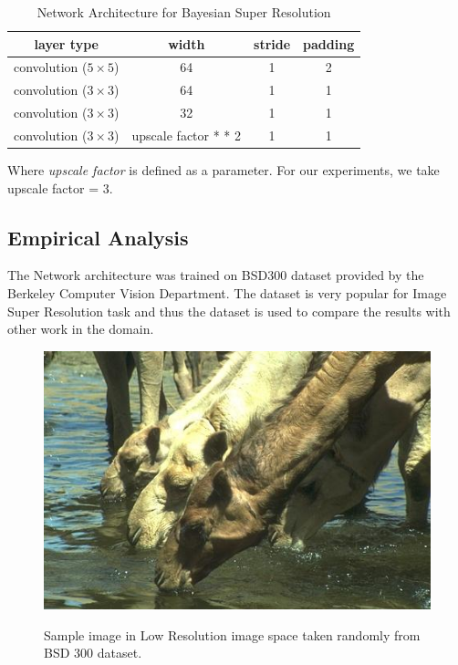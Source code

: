 \begin{table}[H]
    \centering
    \renewcommand{\arraystretch}{2}
    \begin{tabular}{c c c c } 
 \hline
 layer type & width & stride & padding  \\ [0.5ex] 
 \hline
 convolution ($5\times5$) & 64 & 1 & 2 \\
 
 convolution ($3\times3$) & 64 & 1 & 1 \\
 
 
 convolution ($3\times3$) & 32 & 1 & 1 \\
 
 convolution ($3\times3$) & upscale factor * * 2 & 1 & 1  \\ [1ex] 
 \hline
\end{tabular}
\renewcommand{\arraystretch}{1.5}
\label{tab:SuperResolutionArchitecture}
\caption{Network Architecture for Bayesian Super Resolution}
\end{table}

Where \textit{upscale factor} is defined as a parameter. For our experiments, we take upscale factor = 3. 

\subsection{Empirical Analysis}

The Network architecture was trained on BSD300 dataset \cite{MartinFTM01} provided by the Berkeley Computer Vision Department. The dataset is very popular for Image Super Resolution task and thus the dataset is used to compare the results with other work in the domain. 

\begin{figure}[H]
\begin{center}
\includegraphics[height=.28\textheight]{Chapter6/Figs/camel_LR.png}
\label{fig:CamelLR}
\caption{Sample image in Low Resolution image space taken randomly from BSD 300 \cite{MartinFTM01} dataset.}
\end{center}
\end{figure}

